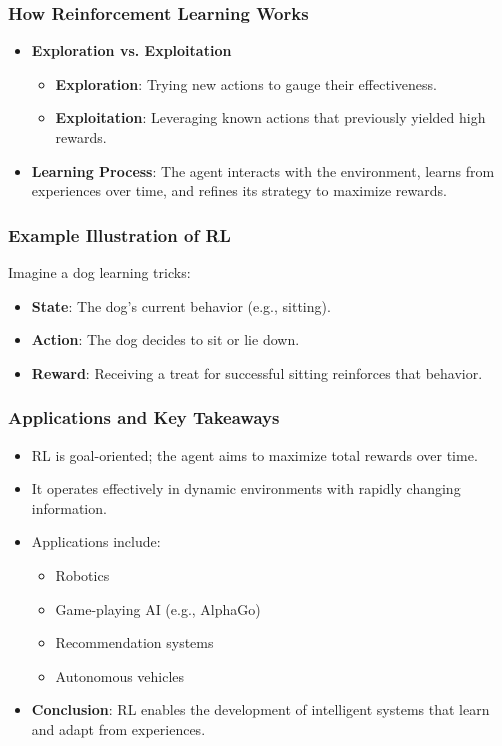 \documentclass[aspectratio=169]{beamer}
\begin{document}
\begin{frame}[fragile]
    \frametitle{How Reinforcement Learning Works}
    \begin{itemize}
        \item \textbf{Exploration vs. Exploitation}
        \begin{itemize}
            \item \textbf{Exploration}: Trying new actions to gauge their effectiveness.
            \item \textbf{Exploitation}: Leveraging known actions that previously yielded high rewards.
        \end{itemize}
        \item \textbf{Learning Process}: The agent interacts with the environment, learns from experiences over time, and refines its strategy to maximize rewards.
    \end{itemize}
\end{frame}

\begin{frame}[fragile]
    \frametitle{Example Illustration of RL}
    Imagine a dog learning tricks:
    \begin{itemize}
        \item \textbf{State}: The dog's current behavior (e.g., sitting).
        \item \textbf{Action}: The dog decides to sit or lie down.
        \item \textbf{Reward}: Receiving a treat for successful sitting reinforces that behavior.
    \end{itemize}
\end{frame}

\begin{frame}[fragile]
    \frametitle{Applications and Key Takeaways}
    \begin{itemize}
        \item RL is goal-oriented; the agent aims to maximize total rewards over time.
        \item It operates effectively in dynamic environments with rapidly changing information.
        \item Applications include:
        \begin{itemize}
            \item Robotics
            \item Game-playing AI (e.g., AlphaGo)
            \item Recommendation systems
            \item Autonomous vehicles
        \end{itemize}
        \item \textbf{Conclusion}: RL enables the development of intelligent systems that learn and adapt from experiences.
    \end{itemize}
\end{frame}
\end{document}
